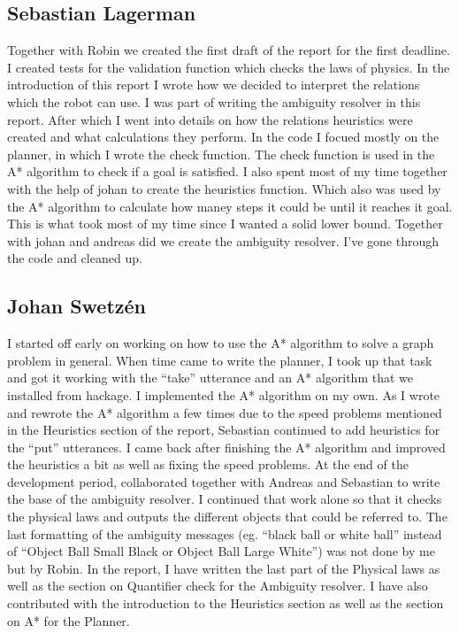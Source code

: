 \subsection*{Sebastian Lagerman}
Together with Robin we created the first draft of the report for the first deadline.
\newline
\newline
I created tests for the validation function which checks the laws of physics.
\newline
\newline
In the introduction of this report I wrote how we decided to interpret the relations which the robot can use.
I was part of writing the ambiguity resolver in this report.
After which I went into details on how the relations heuristics were created and what calculations they perform.
\newline
\newline
In the code I focued mostly on the planner, in which I wrote the check function.
The check function is used in the A* algorithm to check if a goal is satisfied.
I also spent most of my time together with the help of johan to create the heuristics function.
Which also was used by the A* algorithm to calculate how maney steps it could be until it reaches it goal.
This is what took most of my time since I wanted a solid lower bound.
Together with johan and andreas did we create the ambiguity resolver.
I've gone through the code and cleaned up.


\subsection*{Johan Swetz\'en}
I started off early on working on how to use the A* algorithm to solve a graph problem in general.
When time came to write the planner, I took up that task and got it working with the ``take'' utterance and an A* algorithm that we installed from hackage.
\newline
\newline
I implemented the A* algorithm on my own.
As I wrote and rewrote the A* algorithm a few times due to the speed problems mentioned in the Heuristics section of the report, Sebastian continued to add heuristics for the ``put'' utterances. I came back after finishing the A* algorithm and improved the heuristics a bit as well as fixing the speed problems.
\newline
\newline
At the end of the development period, collaborated together with Andreas and Sebastian to write the base of the ambiguity resolver.
I continued that work alone so that it checks the physical laws and outputs the different objects that could be referred to.
The last formatting of the ambiguity messages (eg. ``black ball or white ball'' instead of ``Object Ball Small Black or Object Ball Large White'') was not done by me but by Robin.
\newline
\newline
In the report, I have written the last part of the Physical laws as well as the section on Quantifier check for the Ambiguity resolver.
I have also contributed with the introduction to the Heuristics section as well as the section on A* for the Planner.


